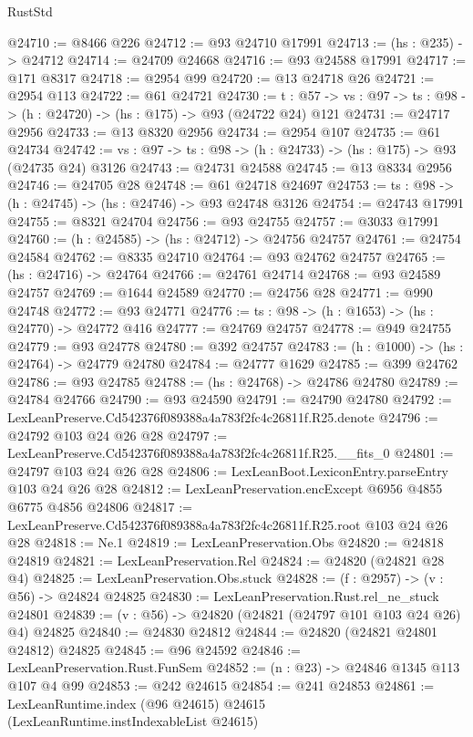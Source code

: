 \begin{lexlean}{RustStd}
\begin{coremodule}
@24710 := @8466 @226
@24712 := @93 @24710 @17991
@24713 := (hs : @235) -> @24712
@24714 := @24709 @24668
@24716 := @93 @24588 @17991
@24717 := @171 @8317
@24718 := @2954 @99
@24720 := @13 @24718 @26
@24721 := @2954 @113
@24722 := @61 @24721
@24730 := {t : @57} ->
  {vs : @97} -> {ts : @98} -> (h : @24720) -> (hs : @175) -> @93 (@24722 @24) @121
@24731 := @24717 @2956
@24733 := @13 @8320 @2956
@24734 := @2954 @107
@24735 := @61 @24734
@24742 := {vs : @97} -> {ts : @98} -> (h : @24733) -> (hs : @175) -> @93 (@24735 @24) @3126
@24743 := @24731 @24588
@24745 := @13 @8334 @2956
@24746 := @24705 @28
@24748 := @61 @24718 @24697
@24753 := {ts : @98} -> (h : @24745) -> (hs : @24746) -> @93 @24748 @3126
@24754 := @24743 @17991
@24755 := @8321 @24704
@24756 := @93 @24755
@24757 := @3033 @17991
@24760 := (h : @24585) -> (hs : @24712) -> @24756 @24757
@24761 := @24754 @24584
@24762 := @8335 @24710
@24764 := @93 @24762 @24757
@24765 := (hs : @24716) -> @24764
@24766 := @24761 @24714
@24768 := @93 @24589 @24757
@24769 := @1644 @24589
@24770 := @24756 @28
@24771 := @990 @24748
@24772 := @93 @24771
@24776 := {ts : @98} -> (h : @1653) -> (hs : @24770) -> @24772 @416
@24777 := @24769 @24757
@24778 := @949 @24755
@24779 := @93 @24778
@24780 := @392 @24757
@24783 := (h : @1000) -> (hs : @24764) -> @24779 @24780
@24784 := @24777 @1629
@24785 := @399 @24762
@24786 := @93 @24785
@24788 := (hs : @24768) -> @24786 @24780
@24789 := @24784 @24766
@24790 := @93 @24590
@24791 := @24790 @24780
@24792 := LexLeanPreserve.Cd542376f089388a4a783f2fc4c26811f.R25.denote
@24796 := @24792 @103 @24 @26 @28
@24797 := LexLeanPreserve.Cd542376f089388a4a783f2fc4c26811f.R25.__fits_0
@24801 := @24797 @103 @24 @26 @28
@24806 := LexLeanBoot.LexiconEntry.parseEntry @103 @24 @26 @28
@24812 := LexLeanPreservation.encExcept @6956 @4855 @6775 @4856 @24806
@24817 := LexLeanPreserve.Cd542376f089388a4a783f2fc4c26811f.R25.root @103 @24 @26 @28
@24818 := Ne.{1}
@24819 := LexLeanPreservation.Obs
@24820 := @24818 @24819
@24821 := LexLeanPreservation.Rel
@24824 := @24820 (@24821 @28 @4)
@24825 := LexLeanPreservation.Obs.stuck
@24828 := (f : @2957) -> (v : @56) -> @24824 @24825
@24830 := LexLeanPreservation.Rust.rel_ne_stuck @24801
@24839 := (v : @56) -> @24820 (@24821 (@24797 @101 @103 @24 @26) @4) @24825
@24840 := @24830 @24812
@24844 := @24820 (@24821 @24801 @24812) @24825
@24845 := @96 @24592
@24846 := LexLeanPreservation.Rust.FunSem
@24852 := (n : @23) -> @24846 @1345 @113 @107 @4 @99
@24853 := @242 @24615
@24854 := @241 @24853
@24861 := LexLeanRuntime.index (@96 @24615) @24615 (LexLeanRuntime.instIndexableList @24615)

\end{coremodule}
\end{lexlean}

